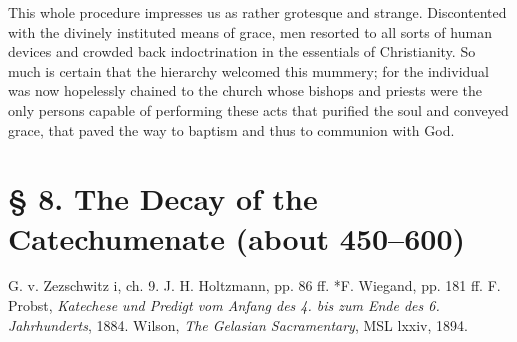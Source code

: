 This whole procedure impresses us as rather grotesque and strange. Discontented with the divinely instituted means of grace, men resorted to all sorts of human devices and crowded back indoctrination in the essentials of Christianity. So much is certain that the hierarchy welcomed this mummery;
for the individual was now hopelessly chained to the church whose bishops and priests were the only persons capable of performing these acts that purified the soul and conveyed grace, that paved the way to baptism and thus to communion with God.

\section[§ 8. Decay of the Catechumenate]{§ 8. The Decay of the Catechumenate (about 450–600)}

G. v. Zezschwitz i, ch. 9. J. H. Holtzmann, pp. 86 ff. *F. Wiegand, pp. 181 ff. F. Probst, \emph{Katechese und Predigt vom Anfang des 4. bis zum Ende des 6. Jahrhunderts}, 1884. Wilson, \emph{The Gelasian Sacramentary}, MSL lxxiv, 1894.

